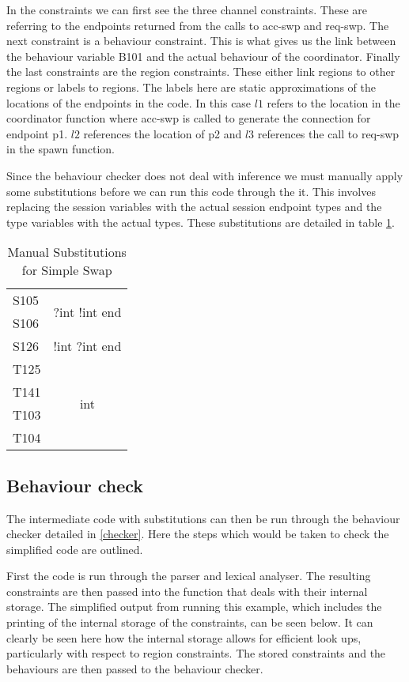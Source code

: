 In the constraints we can first see the three channel constraints. These are referring to the endpoints returned from the calls to acc-swp and req-swp. The next constraint is a behaviour constraint. This is what gives us the link between the behaviour variable B101 and the actual behaviour of the coordinator. Finally the last constraints are the region constraints. These either link regions to other regions or labels to regions. The labels here are static approximations of the locations of the endpoints in the code. In this case $l1$ refers to the location in the coordinator function where acc-swp is called to generate the connection for endpoint p1. $l2$ references the location of p2 and $l3$ references the call to req-swp in the spawn function. 

Since the behaviour checker does not deal with inference we must manually apply some substitutions before we can run this code through the it. This involves replacing the session variables with the actual session endpoint types and the type variables with the actual types. These substitutions are detailed in table \ref{subs}. 

\begin{table}
\centering
\begin{tabular}{l |c}
S105 & \multirow{2}{*}{?int !int end} \\
S106 & \\ \hline
S126 & !int ?int end \\ \hline
T125 & \multirow{4}{*}{int} \\
T141 & \\ 
T103 & \\
T104 & \\ 
\end{tabular}
\caption{Manual Substitutions for Simple Swap}
\label{subs}
\end{table}

\subsection{Behaviour check}

The intermediate code with substitutions can then be run through the behaviour checker detailed in \ref{checker}. Here the steps which would be taken to check the simplified code are outlined. 

First the code is run through the parser and lexical analyser. The resulting constraints are then passed into the function that deals with their internal storage. The simplified output from running this example, which includes the printing of the internal storage of the constraints, can be seen below. It can clearly be seen here how the internal storage allows for efficient look ups, particularly with respect to region constraints. The stored constraints and the behaviours are then passed to the behaviour checker. 


